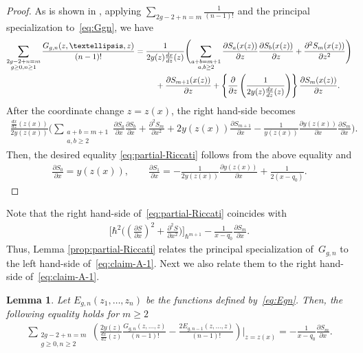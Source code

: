 \documentclass[11pt]{article}
\newtheorem{lem}[thm]{Lemma}
\theoremstyle{definition}
\numberwithin{equation}{section}
\def\p{\partial}
\begin{document}
\begin{proof}
As is shown in \cite[Theorem 6.5]{DM14},
applying $\sum\limits_{2g-2+n=m} \frac{1}{(n-1)!}$
and the principal specia\-li\-zation to~\eqref{eq:Ggn}, we have
\begin{gather*}
\sum_{\substack{2g-2+n=m \\ g\ge0, n\ge 1}}
\frac{G_{g,n}(z,\dots,z)}{(n-1)!} = \frac{1}{2y(z)\frac{dx}{dz}(z)}
\Biggl( \sum_{\substack{a+b=m+1 \\ a,b \ge 2}}
\frac{\p S_{a}(x(z))}{\p z} \frac{\p S_{b}(x(z))}{\p z} +
\frac{\p^{2}S_{m}(x(z))}{\p z^{2}} \Biggr)
\\
\hphantom{\sum_{\substack{2g-2+n=m \\ g\ge0, n\ge 1}}
\frac{G_{g,n}(z,\dots,z)}{(n-1)!} =}{}
+ \frac{\p S_{m+1}(x(z))}{\p z}
+ \left\{ \frac{\p }{\p z}\left(
\frac{1}{2 y(z) \frac{dx}{dz}(z)} \right) \right\}
\frac{\p S_{m}(x(z))}{\p z}.
\end{gather*}
After the coordinate change $z = z(x)$, the right hand-side becomes
\begin{gather*}
\frac{\frac{dx}{dz}(z(x))}{2y(z(x))}\Biggl(
\sum_{\substack{a+b=m+1 \\ a,b \ge 2}}
\frac{\p S_{a}}{\p x} \frac{\p S_{b}}{\p x} +
\frac{\p^{2}S_{m}}{\p x^{2}} + 2y(z(x)) \frac{\p S_{m+1}}{\p x}
- \frac{1}{y(z(x))}\frac{\p y(z(x))}{\p x} \frac{\p S_{m}}{\p x} \Biggr).
\end{gather*}
Then, the desired equality \eqref{eq:partial-Riccati} follows
from the above equality and
\begin{gather*}
\frac{\p S_{0}}{\p x} = y(z(x)), \qquad
\frac{\p S_{1}}{\p x} =
-\frac{1}{2 y(z(x))} \frac{\p y(z(x))}{\p x} + \frac{1}{2(x-q_{0})}.\tag*{\qed}
\end{gather*}
\renewcommand{\qed}{}
\end{proof}

Note that the right hand-side of~\eqref{eq:partial-Riccati} coincides with
\begin{gather*}
\biggl[ \hbar^{2}\biggl( \left(\frac{\p S}{\p x}\right)^{2} +
\frac{\p^{2} S}{\p x^{2}} \biggr)  \biggr]_{\hbar^{m+1}}
- \frac{1}{x-q_{0}} \frac{\p S_{m}}{\p x}.
\end{gather*}
Thus, Lemma \ref{prop:partial-Riccati} relates
the principal specialization of~$G_{g,n}$
to the left hand-side of~\eqref{eq:claim-A-1}.
Next we also relate them to the right hand-side of~\eqref{eq:claim-A-1}.

\begin{lem} \label{lemma:sum-prin-G-and-E}
Let $E_{g,n}(z_{1},\dots,z_{n})$
be the functions defined by~\eqref{eq:Egn}.
Then, the following equality holds for $m \ge 2$
\begin{gather} \label{eq:sum-prin-G-and-E}
\sum_{\substack{2g-2+n=m \\ g \ge 0, n\ge 2 }}
\left(
\frac{2y(z)}{\frac{dx}{dz}(z)}
\frac{G_{g,n}(z,\dots,z)}{(n-1)!} -
\frac{2 E_{g,n-1}(z,\dots,z)}{(n-1)!}\right)\Biggr|_{z=z(x)}
 = -\frac{1}{x-q_{0}} \frac{\p S_{m}}{\p x}.
\end{gather}
\end{lem}
\end{document}
